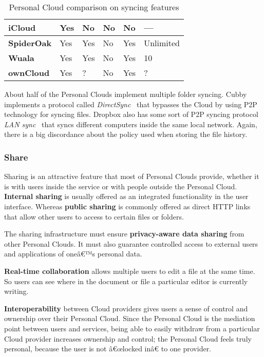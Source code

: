 {\begin{table}
\begin{center}
\begin{tabular}{ | p{3.3cm} | p{1.4cm} | p{1.4cm} | p{2.4cm} | p{1.4cm} | p{2.9cm} | }
	\textbf{iCloud} &
	Yes &
	No &
	No &
	No &
	--- \\ \hline
	
	\textbf{SpiderOak} & 
	Yes &
	Yes &
	No &
	Yes &
	Unlimited \\ \hline

	\textbf{Wuala} &
	Yes &
	Yes &
	No &
	Yes &
	10 \\ \hline
	
	\textbf{ownCloud} &
	Yes &
	? &
	No &
	Yes &
	? \\ \hline

    \end{tabular}
    \caption{Personal Cloud comparison on syncing features}
    \label{tab:pc_syncing}
\end{center}
\end{table}
}

About half of the Personal Clouds implement multiple folder syncing. Cubby implements a protocol called \textit{DirectSync}~\cite{directsync} that bypasses the Cloud by using P2P technology for syncing files. Dropbox also has some sort of P2P syncing protocol \textit{LAN sync}~\cite{lansync} that syncs different computers inside the same local network. Again, there is a big discordance about the policy used when storing the file history.




\subsubsection{Share}


Sharing is an attractive feature that most of Personal Clouds provide, whether it is with users inside the service or with people outside the Personal Cloud. \textbf{Internal sharing} is usually offered as an integrated functionality in the user interface. Whereas \textbf{public sharing} is commonly offered as direct HTTP links that allow other users to access to certain files or folders.

The sharing infrastructure must ensure \textbf{privacy-aware data sharing} from other Personal Clouds. It must also guarantee controlled access to external users and applications of oneâ€™s personal data.

\textbf{Real-time collaboration} allows multiple users to edit a file at the same time. So users can see where in the document or file a particular editor is currently writing.

\textbf{Interoperability} between Cloud providers gives users a sense of control and ownership over their Personal Cloud. Since the Personal Cloud is the mediation point between users and services, being able to easily withdraw from a particular Cloud provider increases ownership and control; the Personal Cloud feels truly personal, because the user is not â€œlocked inâ€ to one provider.


